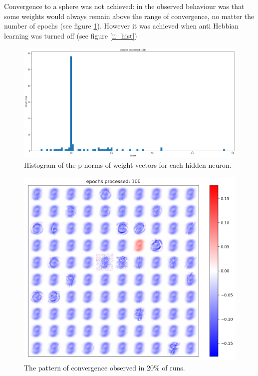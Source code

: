 \documentclass[a4paper]{report}
\begin{document}
 Convergence to a sphere was not achieved:
in the observed behaviour was that some weights would always remain above the range of convergence, no matter the number of epochs (see figure \ref{uu_hist}).
However it was achieved when anti Hebbian learning was turned off (see figure \ref{ii_hist})
\begin{figure} [H]
    \centering
    \includegraphics [width=12cm ] {o/uu_hist.png}
    \caption{Histogram of the p-norms of weight vectors for each hidden neuron.}
    \label{uu_hist}
\end{figure}

\begin{figure} [H]
    \centering
    \includegraphics [width=12cm ] {h/nove.png}
    \caption{The pattern of convergence observed in 20\% of runs.}
    \label{nove}
\end{figure}
\end{document}
